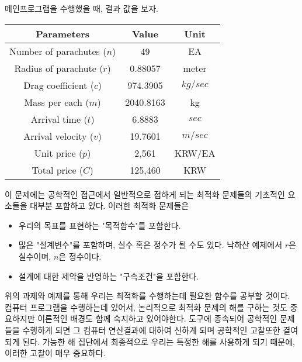 
메인프로그램을 수행했을 때, 결과 값을 보자.
\begin{table}[!hbt]
\centering
\begin{tabular}{c|c|c}
\hline\hline
Parameters&Value&Unit\\
\hline
Number of parachutes ($n$)&49&EA\\
Radius of parachute ($r$)&0.88057&meter\\
Drag coefficient ($c$)&974.3905&$kg/sec$\\
Mass per each ($m$)&2040.8163&kg\\
Arrival time ($t$)&6.8883&$sec$\\
Arrival velocity ($v$)&19.7601&$m/sec$\\
Unit price ($p$)&2,561&KRW/EA\\
Total price ($C$)&125,460&KRW\\
\hline\hline
\end{tabular}
\end{table}
이 문제에는 공학적인 접근에서 일반적으로 접하게 되는 최적화 문제들의 기초적인 요소들을 대부분 포함하고 있다. 이러한 최적화 문제들은
\begin{itemize}
\item 우리의 목표를 표현하는 "목적함수"를 포함한다.
\item 많은 "설계변수"를 포함하며, 실수 혹은 정수가 될 수도 있다. 낙하산 예제에서 $r$은 실수이며, $n$은 정수이다.
\item 설계에 대한 제약을 반영하는 "구속조건"을 포함한다.
\end{itemize}
위의 과제와 예제를 통해 우리는 최적화를 수행하는데 필요한 함수를 공부할 것이다. 컴퓨터 프로그램을 수행하는데 있어서, 논리적으로 최적화 문제의 해를 구하는 것도 중요하지만 이론적인 배경도 함께 숙지하고 있어야한다. 도구에 종속되어 공학적인 문제들을 수행하게 되면 그 컴퓨터 연산결과에 대하여 신하게 되며 공학적인 고찰또한 결여되게 된다. 가능한 해 집단에서 최종적으로 우리는 특정한 해를 사용하게 되기 때문에, 이러한 고찰이 매우 중요하다.

